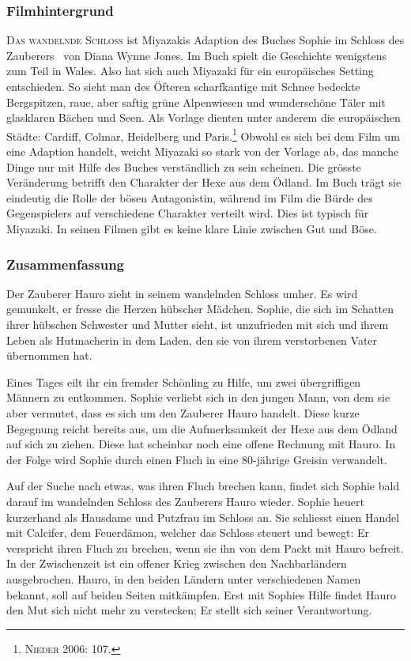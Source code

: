 \subsubsection{Filmhintergrund} 
\textsc{Das wandelnde Schloss} ist Miyazakis Adaption des Buches \glqq Sophie im Schloss des Zauberers\grqq~ von Diana Wynne Jones. Im Buch spielt die Geschichte wenigstens zum Teil in Wales. Also hat sich auch Miyazaki für ein europäisches Setting entschieden. So sieht man des Öfteren scharfkantige mit Schnee bedeckte Bergspitzen, raue, aber saftig grüne Alpenwiesen und wunderschöne Täler mit glasklaren Bächen und Seen. Als Vorlage dienten unter anderem die europäischen Städte: Cardiff, Colmar, Heidelberg und Paris.\footnote{\textsc{Nieder} 2006: 107.} Obwohl es sich bei dem Film um eine Adaption handelt, weicht Miyazaki so stark von der Vorlage ab, das manche Dinge nur mit Hilfe des Buches verständlich zu sein scheinen. 
Die grösste Veränderung betrifft den Charakter der Hexe aus dem Ödland. Im Buch trägt sie eindeutig die Rolle der bösen Antagonistin, während im Film die Bürde des Gegenspielers auf verschiedene Charakter verteilt wird. Dies ist typisch für Miyazaki. In seinen Filmen gibt es keine klare Linie zwischen Gut und Böse. 

\subsubsection{Zusammenfassung} 
Der Zauberer Hauro zieht in seinem wandelnden Schloss umher. Es wird gemunkelt, er fresse die Herzen hübscher Mädchen. Sophie, die sich im Schatten ihrer hübschen Schwester und Mutter sieht, ist unzufrieden mit sich und ihrem Leben als Hutmacherin in dem Laden, den sie von ihrem verstorbenen Vater übernommen hat.

Eines Tages eilt ihr ein fremder Schönling zu Hilfe, um zwei übergriffigen Männern zu entkommen. Sophie verliebt sich in den jungen Mann, von dem sie aber vermutet, dass es sich um den Zauberer Hauro handelt. Diese kurze Begegnung reicht bereits aus, um die Aufmerksamkeit der Hexe aus dem Ödland auf sich zu ziehen. Diese hat scheinbar noch eine offene Rechnung mit Hauro. In der Folge wird Sophie durch einen Fluch in eine 80-jährige Greisin verwandelt. 

Auf der Suche nach etwas, was ihren Fluch brechen kann, findet sich Sophie bald darauf im wandelnden Schloss des Zauberers Hauro wieder. Sophie heuert kurzerhand als Hausdame und Putzfrau im Schloss an. Sie schliesst einen Handel mit Calcifer, dem Feuerdämon, welcher das Schloss steuert und bewegt: Er verspricht ihren Fluch zu brechen, wenn sie ihn von dem Packt mit Hauro befreit. In der Zwischenzeit ist ein offener Krieg zwischen den Nachbarländern ausgebrochen. Hauro, in den beiden Ländern unter verschiedenen Namen bekannt, soll auf beiden Seiten mitkämpfen. Erst mit Sophies Hilfe findet Hauro den Mut sich nicht mehr zu verstecken; Er stellt sich seiner Verantwortung. 

